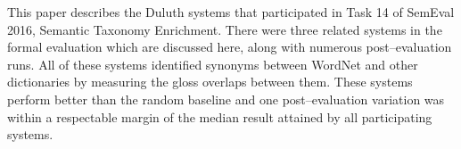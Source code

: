 This paper describes the Duluth systems that participated in Task 14 of SemEval 2016, Semantic Taxonomy Enrichment. There were three related systems in the formal evaluation which are discussed here, along with numerous post--evaluation runs. All of these systems identified synonyms between WordNet and other dictionaries by measuring the gloss overlaps between them. These systems perform better than the random baseline and one post--evaluation variation was within a respectable margin of the median result attained by all participating systems.
